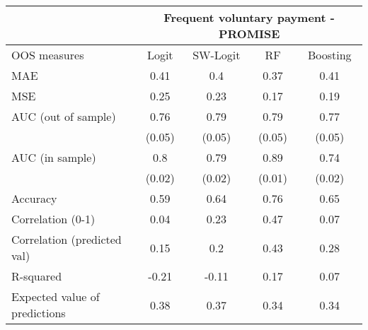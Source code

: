 \begin{tabular}{lcccc}
\toprule
      & \multicolumn{4}{c}{Frequent voluntary payment - PROMISE} \\
\midrule
\midrule
OOS measures & Logit & SW-Logit & RF    & Boosting \\
\midrule
\midrule
MAE   & 0.41  & 0.4   & 0.37  & 0.41 \\
MSE   & 0.25  & 0.23  & 0.17  & 0.19 \\
AUC (out of sample) & 0.76  & 0.79  & 0.79  & 0.77 \\
      & (0.05) & (0.05) & (0.05) & (0.05) \\
AUC (in sample) & 0.8   & 0.79  & 0.89  & 0.74 \\
      & (0.02) & (0.02) & (0.01) & (0.02) \\
Accuracy & 0.59  & 0.64  & 0.76  & 0.65 \\
Correlation (0-1) & 0.04  & 0.23  & 0.47  & 0.07 \\
Correlation (predicted val) & 0.15  & 0.2   & 0.43  & 0.28 \\
R-squared  & -0.21 & -0.11 & 0.17  & 0.07 \\
Expected value of predictions & 0.38  & 0.37  & 0.34  & 0.34 \\
\bottomrule
\bottomrule
\end{tabular}%
